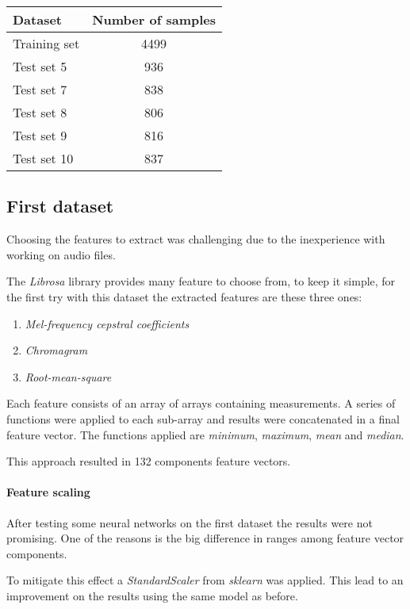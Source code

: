 \begin{center}
    \begin{tabular}{ |l|c| } 
        \hline
        Dataset & Number of samples \\
        \hline
        Training set & 4499 \\
        Test set 5 & 936 \\
        Test set 7 & 838 \\
        Test set 8 & 806 \\
        Test set 9 & 816 \\
        Test set 10 & 837 \\
        \hline
    \end{tabular}
\end{center}

\subsection{First dataset}
Choosing the features to extract was challenging due to the inexperience
with working on audio files.  

The \emph{Librosa} library provides many feature to choose from,
to keep it simple, for the first try with this dataset the extracted features 
are these three ones: 
\begin{enumerate}
    \item \emph{Mel-frequency cepstral coefficients}
    \item \emph{Chromagram}
    \item \emph{Root-mean-square}
\end{enumerate}
Each feature consists of an array of arrays containing measurements. 
A series of functions were applied to each sub-array and results 
were concatenated in a final feature vector. 
The functions applied are \emph{minimum}, \emph{maximum}, \emph{mean} 
and \emph{median}.

This approach resulted in 132 components feature vectors.

\paragraph{Feature scaling}
After testing some neural networks on the first dataset the results 
were not promising. One of the reasons is the big difference in 
ranges among feature vector components.

To mitigate this effect a \emph{StandardScaler} from \emph{sklearn} was applied.
This lead to an improvement on the results using the same 
model as before. 

